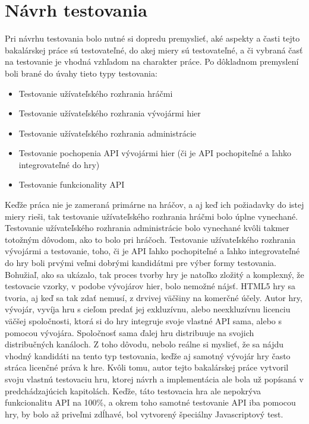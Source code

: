 \section{Návrh testovania}
Pri návrhu testovania bolo nutné si dopredu premyslieť, aké aspekty a časti tejto bakalárskej práce sú testovateľné, do akej miery sú testovateľné, a či vybraná časť na testovanie je vhodná vzhľadom na charakter práce. Po dôkladnom premyslení boli brané do úvahy tieto typy testovania:  
\begin{itemize}
\item Testovanie užívateľského rozhrania hráčmi
\item Testovanie užívateľského rozhrania vývojármi hier
\item Testovanie užívateľského rozhrania administrácie
\item Testovanie pochopenia API vývojármi hier (či je API pochopiteľné a ľahko integrovateľné do hry)
\item Testovanie funkcionality API
\end{itemize}
Keďže práca nie je zameraná primárne na hráčov, a aj keď ich požiadavky do istej miery rieši, tak testovanie užívateľského rozhrania hráčmi bolo úplne vynechané. Testovanie užívateľského rozhrania administrácie bolo vynechané kvôli takmer totožným dôvodom, ako to bolo pri hráčoch. Testovanie užívateľského rozhrania vývojármi a testovanie, toho, či je API ľahko pochopiteľné a ľahko integrovateľné do hry boli prvými veľmi dobrými kandidátmi pre výber formy testovania. Bohužiaľ, ako sa ukázalo, tak proces tvorby hry je natoľko zložitý a komplexný, že testovacie vzorky, v podobe vývojárov hier, bolo nemožné nájsť. HTML5 hry sa tvoria, aj keď sa tak zdať nemusí, z drvivej väčšiny na komerčné účely. Autor hry, vývojár, vyvíja hru s cieľom predať jej exkluzívnu, alebo neexkluzívnu licenciu väčšej spoločnosti, ktorá si do hry integruje svoje vlastné API sama, alebo s pomocou vývojára. Spoločnosť sama ďalej hru distribuuje na svojich distribučných kanáloch. Z toho dôvodu, nebolo reálne si myslieť, že sa nájdu vhodný kandidáti na tento typ testovania, keďže aj samotný vývojár hry často stráca licenčné práva k hre. Kvôli tomu, autor tejto bakalárskej práce vytvoril svoju vlastnú testovaciu hru, ktorej návrh a implementácia ale bola už popísaná v predchádzajúcich kapitolách.  Keďže, táto testovacia hra ale nepokrýva funkcionalitu API na 100\%, a okrem toho samotné testovanie API iba pomocou hry, by bolo až priveľmi zdĺhavé, bol vytvorený špeciálny Javascriptový test. 

